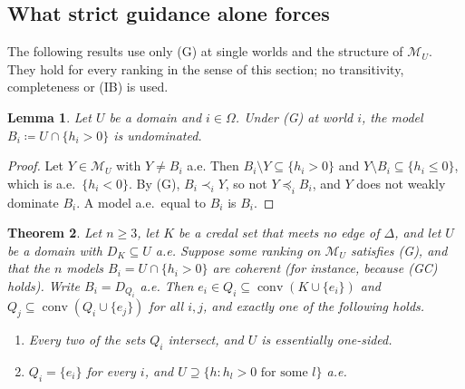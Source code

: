 \documentclass[11pt]{article}
\newcommand{\M}{\mathcal{M}}
\DeclareMathOperator{\conv}{conv}
\theoremstyle{plain}
\newtheorem{theorem}{Theorem}[section]
\newtheorem{lemma}[theorem]{Lemma}
\theoremstyle{definition}
\theoremstyle{remark}
\begin{document}
\subsection{What strict guidance alone forces}\label{sec:guidance}

The following results use only (G) at single worlds and the structure of $\M_U$. They hold
for every ranking in the sense of this section; no transitivity, completeness or (IB) is
used.

\begin{lemma}\label{lem:worldbest}
Let $U$ be a domain and $i\in\Omega$. Under (G) at world $i$, the model $B_i\coloneqq
U\cap\{h_i>0\}$ is undominated.
\end{lemma}

\begin{proof}
Let $Y\in\M_U$ with $Y\neq B_i$ a.e. Then $B_i\setminus Y\subseteq\{h_i>0\}$ and
$Y\setminus B_i\subseteq\{h_i\le0\}$, which is a.e.\ $\{h_i<0\}$. By (G), $B_i\prec_iY$,
so not $Y\preceq_iB_i$, and $Y$ does not weakly dominate $B_i$. A model a.e.\ equal to
$B_i$ is $B_i$.
\end{proof}

\begin{theorem}\label{thm:dichotomy}
Let $n\ge3$, let $K$ be a credal set that meets no edge of $\Delta$, and let $U$ be a domain
with $D_K\subseteq U$ a.e. Suppose some ranking on $\M_U$ satisfies (G), and that the $n$
models $B_i=U\cap\{h_i>0\}$ are coherent (for instance, because (GC) holds). Write
$B_i=D_{Q_i}$ a.e. Then $e_i\in Q_i\subseteq\conv(K\cup\{e_i\})$ and $Q_j\subseteq
\conv(Q_i\cup\{e_j\})$ for all $i,j$, and exactly one of the following holds.
\begin{enumerate}[label=(\alph*)]
  \item Every two of the sets $Q_i$ intersect, and $U$ is essentially one-sided.
  \item $Q_i=\{e_i\}$ for every $i$, and $U\supseteq\{h:h_l>0\text{ for some }l\}$ a.e.
\end{enumerate}
\end{theorem}
\end{document}
